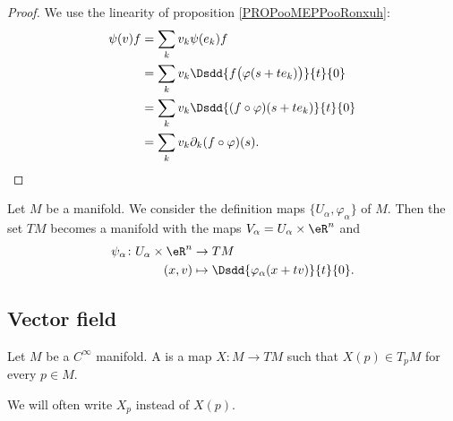 \begin{proof}
	We use the linearity of proposition \ref{PROPooMEPPooRonxuh}:
	\begin{subequations}
		\begin{align}
			\psi(v)f & =\sum_kv_k\psi(e_k)f                                  \\
			         & =\sum_kv_k\Dsdd{ f\big( \varphi(s+te_k) \big) }{t}{0} \\
			         & =\sum_kv_k\Dsdd{ (f\circ\varphi)(s+te_k) }{t}{0}      \\
			         & =\sum_kv_k\partial_k(f\circ\varphi)(s).
		\end{align}
	\end{subequations}
\end{proof}

\begin{theorem}     \label{THOooTSQXooLvJMQb}
	Let \( M\) be a manifold. We consider the definition maps \( \{ U_{\alpha}, \varphi_{\alpha} \}\) of \( M\). Then the set \( TM\) becomes a manifold with the maps \( V_{\alpha}=U_{\alpha}\times \eR^n\) and
	\begin{equation}
		\begin{aligned}
			\psi_{\alpha}\colon U_{\alpha}\times \eR^n & \to TM                                         \\
			(x,v)                                      & \mapsto \Dsdd{ \varphi_{\alpha}(x+tv) }{t}{0}.
		\end{aligned}
	\end{equation}
\end{theorem}


\subsection{Vector field}

\begin{definition}        \label{DEFooAATTooLhNqDb}
	Let \( M\) be a \(  C^{\infty}\) manifold. A  is a map \( X\colon M\to TM\) such that \( X(p)\in T_pM\) for every \( p\in M\).

	We will often write \( X_p\) instead of \( X(p)\).
\end{definition}

